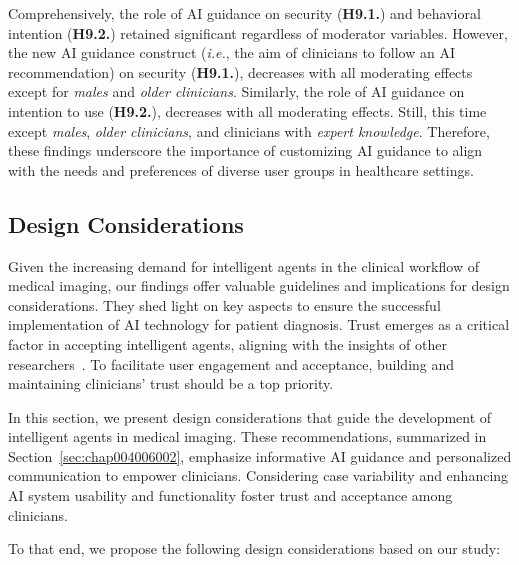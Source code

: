 Comprehensively, the role of \ac{AI} guidance on security ({\bf H9.1.}) and behavioral intention ({\bf H9.2.}) retained significant regardless of moderator variables.
However, the new \ac{AI} guidance construct ({\it i.e.}, the aim of clinicians to follow an \ac{AI} recommendation) on security ({\bf H9.1.}), decreases with all moderating effects except for {\it males} and {\it older clinicians}.
Similarly, the role of \ac{AI} guidance on intention to use ({\bf H9.2.}), decreases with all moderating effects.
Still, this time except {\it males}, {\it older clinicians}, and clinicians with {\it expert knowledge}.
Therefore, these findings underscore the importance of customizing \ac{AI} guidance to align with the needs and preferences of diverse user groups in healthcare settings.

\subsection{Design Considerations}
\label{chap:app002005002}

Given the increasing demand for intelligent agents in the clinical workflow of medical imaging, our findings offer valuable guidelines and implications for design considerations.
They shed light on key aspects to ensure the successful implementation of \ac{AI} technology for patient diagnosis.
Trust emerges as a critical factor in accepting intelligent agents, aligning with the insights of other researchers~\cite{LIU2022107026}.
To facilitate user engagement and acceptance, building and maintaining clinicians' trust should be a top priority.

In this section, we present design considerations that guide the development of intelligent agents in medical imaging.
These recommendations, summarized in Section~\ref{sec:chap004006002}, emphasize informative \ac{AI} guidance and personalized communication to empower clinicians.
Considering case variability and enhancing \ac{AI} system usability and functionality foster trust and acceptance among clinicians.

\vspace{1.50mm}

\noindent
To that end, we propose the following design considerations based on our study:

\vspace{0.05mm}

